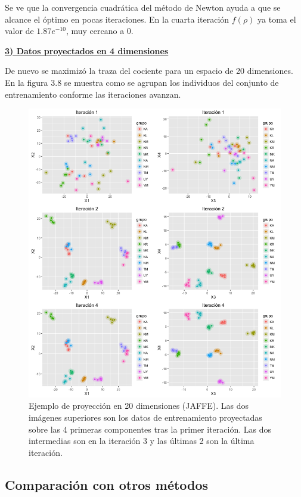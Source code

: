 Se ve que la convergencia cuadrática del método de Newton ayuda a que se alcance el óptimo en pocas iteraciones. En la cuarta iteración $f(\rho)$ ya toma el valor de $1.87 e^{-10}$, muy cercano a 0. 

\pagebreak
\underline{\textbf{3) Datos proyectados en 4 dimensiones}}

De nuevo se maximizó la traza del cociente para un espacio de 20 dimensiones. En la figura 3.8 se muestra como se agrupan los individuos del conjunto de entrenamiento conforme las iteraciones avanzan.

\begin{figure}[!ht]
  \centering
  \includegraphics[width=1\textwidth]{Figures/Chapter4_ejemplo20componentes_JAF.png} 
  \caption[Ejemplo de proyección en 20 dimensiones (JAFFE).]
  {Ejemplo de proyección en 20 dimensiones (JAFFE). Las dos imágenes superiores son los datos de entrenamiento proyectadas sobre las 4 primeras componentes tras la primer iteración. Las dos intermedias son en la iteración 3 y las últimas 2 son la última iteración.}
\end{figure}


\subsection{Comparación con otros métodos}

